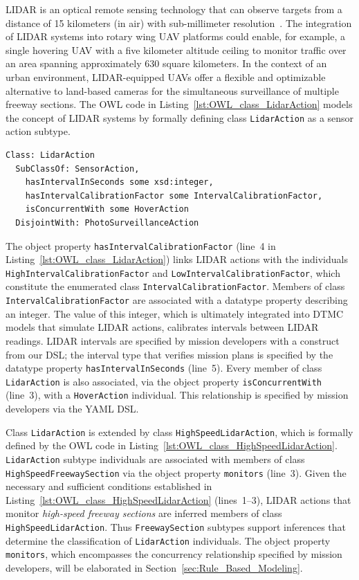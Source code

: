 LIDAR is an optical remote sensing technology that can observe targets from a distance of 15 kilometers (in air) with sub-millimeter resolution~\cite{Piracha_2010}. The integration of LIDAR systems into rotary wing UAV platforms could enable, for example, a single hovering UAV with a five kilometer altitude ceiling to monitor traffic over an area spanning approximately 630 square kilometers. In the context of an urban environment, LIDAR-equipped UAVs offer a flexible and optimizable alternative to land-based cameras for the simultaneous surveillance of multiple freeway sections. The OWL code in Listing~\ref{lst:OWL_class_LidarAction} models the concept of LIDAR systems by formally defining class \texttt{LidarAction} as a sensor action subtype.

\begin{lstlisting}[caption={OWL code for class \texttt{LidarAction}},label=lst:OWL_class_LidarAction]
Class: LidarAction
  SubClassOf: SensorAction,
    hasIntervalInSeconds some xsd:integer,
    hasIntervalCalibrationFactor some IntervalCalibrationFactor,
    isConcurrentWith some HoverAction
  DisjointWith: PhotoSurveillanceAction
\end{lstlisting}

The object property \texttt{hasIntervalCalibrationFactor} (line~4 in Listing~\ref{lst:OWL_class_LidarAction}) links LIDAR actions with the individuals \texttt{HighIntervalCalibrationFactor} and \texttt{LowInter\-valCalibrationFactor}, which constitute the enumerated class \texttt{IntervalCalibration\-Factor}. Members of class \texttt{IntervalCalibrationFactor} are associated with a datatype property describing an integer. The value of this integer, which is ultimately integrated into DTMC models that simulate LIDAR actions, calibrates intervals between LIDAR readings. LIDAR intervals are specified by mission developers with a construct from our DSL; the interval type that verifies mission plans is specified by the datatype property \texttt{hasIntervalInSeconds} (line~5). Every member of class \texttt{LidarAction} is also associated, via the object property \texttt{isConcurrentWith} (line~3), with a \texttt{HoverAction} individual. This relationship is specified by mission developers via the YAML DSL\@.

Class \texttt{LidarAction} is extended by class \texttt{HighSpeedLidarAction}, which is formally defined by the OWL code in Listing~\ref{lst:OWL_class_HighSpeedLidarAction}. \texttt{LidarAction} subtype individuals are associated with members of class \texttt{HighSpeedFreewaySection} via the object property \texttt{monitors} (line~3). Given the necessary and sufficient conditions established in Listing~\ref{lst:OWL_class_HighSpeedLidarAction} (lines~1--3), LIDAR actions that monitor \emph{high-speed freeway sections} are inferred members of class \texttt{HighSpeedLidarAction}. Thus \texttt{FreewaySection} subtypes support inferences that determine the classification of \texttt{LidarAction} individuals. The object property \texttt{monitors}, which encompasses the concurrency relationship specified by mission developers, will be elaborated in Section~\ref{sec:Rule_Based_Modeling}.

